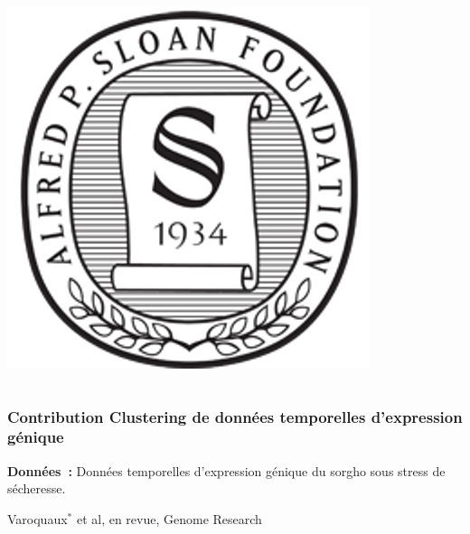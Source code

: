 \documentclass[11pt,xcolor=dvipsnames]{beamer}
\begin{document}
\begin{frame}
\begin{columns}
\begin{column}{0.08\linewidth}
\vspace{15pt}
\includegraphics[width=0.9\linewidth]{images/sloan_foundation.png}
\end{column}
\end{columns}
\end{frame}


\begin{frame}
\frametitle{Contribution \quad Clustering de données temporelles
d'expression génique}
\footnotesize
\begin{overlayarea}{12cm}{5cm}
\vspace{1em}
{\bf Données~:} Données temporelles d'expression génique du sorgho sous stress
de sécheresse.

\vspace{1em}

\vspace{1em}
\end{overlayarea}

\begin{flushright}
{\tiny {\color{red} Varoquaux$^*$} et al, en revue, Genome Research}
\end{flushright}
\begin{overlayarea}{12cm}{3cm}
{\centering
\begin{center}
\end{center}}
\end{overlayarea}
\end{frame}
\end{document}
